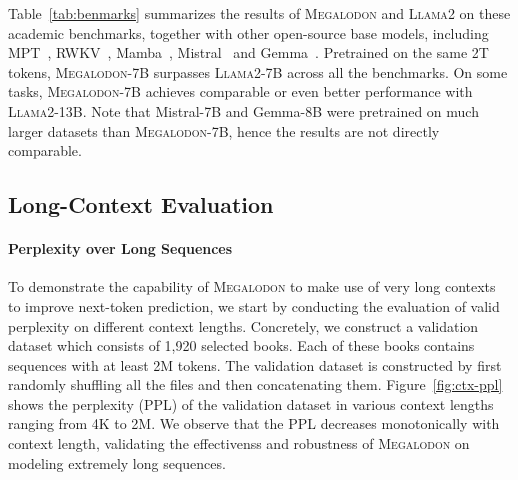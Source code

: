 Table~\ref{tab:benmarks} summarizes the results of \textsc{Megalodon} and \textsc{Llama}2 on these academic benchmarks, together with other open-source base models, including MPT~\citep{mpt7b}, RWKV~\citep{peng2023rwkv}, Mamba~\citep{gu2023mamba}, Mistral~\citep{jiang2023mistral} and Gemma~\citep{team2024gemma}. Pretrained on the same 2T tokens, \textsc{Megalodon}-7B surpasses \textsc{Llama}2-7B across all the benchmarks. On some tasks, \textsc{Megalodon}-7B achieves comparable or even better performance with \textsc{Llama}2-13B. 
Note that Mistral-7B and Gemma-8B were pretrained on much larger datasets than \textsc{Megalodon}-7B, hence the results are not directly comparable.

\subsection{Long-Context Evaluation}

\paragraph{Perplexity over Long Sequences} To demonstrate the capability of \textsc{Megalodon} to make use of very long contexts to improve next-token prediction, we start by conducting the evaluation of valid perplexity on different context lengths. Concretely, we construct a validation dataset which consists of 1,920 selected books. Each of these books contains sequences with at least 2M tokens. The validation dataset is constructed by first randomly shuffling all the files and then concatenating them. 
Figure~\ref{fig:ctx-ppl} shows the perplexity (PPL) of the validation dataset in various context lengths ranging from 4K to 2M. We observe that the PPL decreases monotonically with context length, validating the effectivenss and robustness of \textsc{Megalodon} on modeling extremely long sequences.


